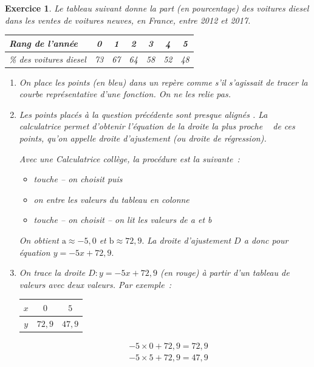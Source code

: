 \documentclass[10pt]{article}
\newtheorem{exo}{Exercice}
\begin{document}
\begin{exo}

Le tableau suivant donne la part (en pourcentage) des voitures diesel dans les ventes
de voitures neuves, en France, entre 2012 et 2017.

\begin{center}
\begin{tabular}{|m{3cm}|*{6}{c|}}\hline
Rang de l'année 	&0 		&1 		&2 		&3 		&4 		&5\\ \hline
\% des voitures 
diesel	&73 	&67 	&64 	&58 	&52 	&48\\ \hline
\end{tabular}
\end{center}




\begin{enumerate}
\item On place les points (en bleu) dans un repère comme s'il s'agissait de tracer la courbe représentative d'une fonction. On ne les relie pas.
\item Les points placés à la question précédente sont \og presque alignés \fg. La calculatrice permet d'obtenir l'équation de la droite \og la plus proche \fg~{} de ces points, qu'on appelle droite d'ajustement (ou droite de régression).

\medskip

Avec une Calculatrice collège, la procédure est la suivante~:

\begin{itemize}
\item[\textbullet] touche  -- on choisit  puis  
\item[\textbullet] on entre les valeurs du tableau en colonne
\item[\textbullet] touche  -- on choisit  -- on lit les valeurs de a et b
\end{itemize}

On obtient $\text{a}\approx -5,0$ et $\text{b}\approx 72,9.$ La droite d'ajustement $D$ a donc pour équation $y=-5x+72,9.$


\item On trace la droite $D:y=-5x+72,9$ (en rouge) à partir d'un tableau de valeurs avec deux valeurs. Par exemple~:

\setlength{\columnseprule}{1pt}

\begin{multicols}{2}
\begin{center}
\begin{tabular}{|c|c|c|}\hline
$x$&$0$&$5$\\ \hline
$y$&$72,9$&$47,9$\\ \hline
\end{tabular}
\end{center}
\columnbreak
\begin{align*}
&-5\times 0+72,9=72,9\\
&-5\times 5+72,9=47,9\end{align*}
\end{multicols}



\end{enumerate}
\end{exo}
\end{document}

